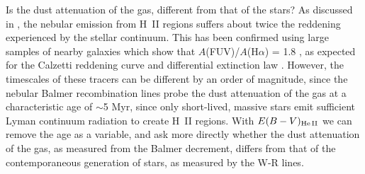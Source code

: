 \documentclass[linenumbers]{aastex63}
\begin{document}

Is the dust attenuation of the gas, different from that of the stars?  As discussed in \citet{calzetti_dust_1994}, the nebular emission from H~II regions suffers about twice the reddening experienced by the stellar continuum.  This has been confirmed using large samples of nearby galaxies which show that $A$(FUV)/$A$(H$\alpha$) = 1.8 \citep[e.g.,][]{lee_comparison_2009}, as expected for the Calzetti reddening curve and differential extinction law \citep{calzetti_dust_2001}. However, the timescales of these tracers can be different by an order of magnitude, since the nebular Balmer recombination lines probe the dust attenuation of the gas at a characteristic age of $\sim$5 Myr, since only short-lived, massive stars emit sufficient Lyman continuum radiation to create H~II regions.  With ${E(B-V)_{\rm He\,II}}$ we can remove the age as a variable, and ask more directly whether the dust attenuation of the gas, as measured from the Balmer decrement, differs from that of the contemporaneous generation of stars, as measured by the W-R lines.
\end{document}
